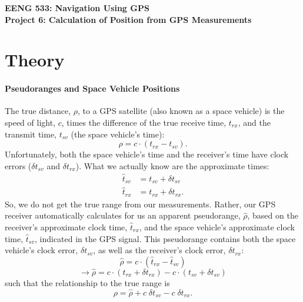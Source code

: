 \documentclass[12pt]{article}
\begin{document}
\begin{minipage}{0.9\textwidth}
   \raggedright
   \large \textbf{\textsf{{\color{gray}EENG 533: Navigation Using GPS} \\
      Project 6: Calculation of Position from GPS Measurements}}
\end{minipage}
\vspace{1cm}

\section*{\textsf{Theory}}

\paragraph{Pseudoranges and Space Vehicle Positions}

The true distance, $\rho$, to a GPS satellite (also known as a space vehicle) is
the speed of light, $c$, times the difference of the true receive time,
$t_{rx}$, and the transmit time, $t_{sv}$ (the space vehicle's time):
\[ \rho = c\cdot \left( t_{rx} - t_{sv} \right) . \]
Unfortunately, both the space vehicle's time and the receiver's time have clock
errors ($\delta t_{sv}$ and $\delta t_{rx}$).  What we actually know are the
approximate times:
\begin{align*}
   \hat{t}_{sv} &= t_{sv} + \delta t_{sv} \\
   \hat{t}_{rx} &= t_{rx} + \delta t_{rx} .
\end{align*}
So, we do not get the true range from our measurements.  Rather, our GPS
receiver automatically calculates for us an apparent pseudorange, $\hat{\rho}$,
based on the receiver's approximate clock time, $\hat{t}_{rx}$, and the space
vehicle's approximate clock time, $\hat{t}_{sv}$, indicated in the GPS signal.
This pseudorange contains both the space vehicle's clock error, $\delta t_{sv}$,
as well as the receiver's clock error, $\delta t_{rx}$:
\[ \hat{\rho} = c\cdot \left( \hat{t}_{rx} - \hat{t}_{sv} \right) \]
\[ \to \hat{\rho} = c\cdot \left( t_{rx} + \delta t_{rx} \right)
   - c\cdot \left( t_{sv} + \delta t_{sv} \right) \]
such that the relationship to the true range is
\[ \rho = \hat{\rho} + c\; \delta t_{sv} - c\; \delta t_{rx} . \]
\end{document}
